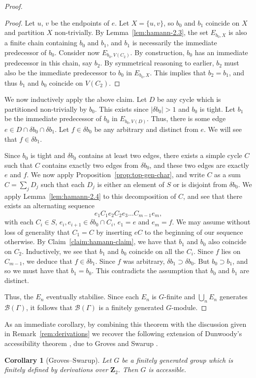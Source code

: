 \documentclass[11pt,a4paper]{amsart}
\newcommand{\Z}{\mathbf{Z}}
\newtheorem{corollary}[theorem]{Corollary}
\theoremstyle{definition}
\newcommand{\br}{{\mathscr{B}}}
\begin{document}
\begin{proof}
\begin{proof}
        Let $u$, $v$ be the endpoints of $e$.
        Let $X = \{u,v\}$, so $b_0$ and $b_1$ coincide on $X$ and partition $X$ non-trivially. By Lemma~\ref{lem:hamann-2.3}, the set $ E _{b_0,X}$ is also a finite chain containing $b_0$ and $b_1$, and $b_1$ is necessarily the immediate predecessor of $b_0$. 
        Consider now $ E _{b_0,V(C_2)}$. By construction, $b_0$ has an immediate predecessor in this chain, say $b_2$. By symmetrical reasoning to earlier, $b_2$ must also be the immediate predecessor to  $b_0$ in $ E _{b_0,X}$. This implies that $b_2 = b_1$, and thus $b_1$ and $b_0$ coincide on $V(C_2)$. 
    \end{proof}

    We now inductively apply the above claim. 
    Let $D$ be any cycle which is partitioned non-trivially by $b_0$. This exists since $|\delta b_0| > 1$ and $b_0$ is tight. Let $b_1$ be the immediate predecessor of $b_0$ in $ E _{b_0,V(D)}$. Thus, there is some edge $e \in D \cap \delta b_0 \cap \delta b_1$. Let $f \in \delta b_0$ be any arbitrary and distinct from $e$. We will see that $f \in \delta b_1$. 
    
    Since $b_0$ is tight and $\delta b_0$ contains at least two edges, there exists a simple cycle $C$ such that $C$ contains exactly two edges from $\delta b_0$, and these two edges are exactly $e$ and $f$. We now apply Proposition~\ref{prop:top-gen-char}, and write $C$ as a sum $C = \sum_j D_j$ such that each $D_j$ is either an element of $S$ or is disjoint from $\delta b_0$.  
    We apply Lemma~\ref{lem:hamann-2.4} to this decomposition of $C$, and see that there exists an alternating sequence 
    $$
    e_1 C_1 e_2C_2e_3 \ldots C_{m-1}e_m,
    $$
    with each $C_i \in  S $, $e_i, e_{i+1} \in \delta b_0 \cap C_i$, $e_1 = e$ and $e_m = f$. We may assume without loss of generality that $C_1 = C$ by inserting $eC$ to the beginning of our sequence otherwise.
    By Claim~\ref{claim:hamann-claim}, we have that $b_1$ and $b_0$ also coincide on $C_2$. Inductively, we see that $b_1$ and $b_0$ coincide on all the $C_i$. Since $f$ lies on $C_{m-1}$, we deduce that $f \in \delta b_1$. Since $f$ was arbitrary, $\delta b_1 \supset \delta b_0$. But $b_0 \supset b_1$, and so we must have that $b_1 = b_0$. This contradicts the assumption that $b_0$ and $b_1$ are distinct. 
    
    Thus, the $ E _n$ eventually stabilise. Since each $ E _n$ is $G$-finite and $\bigcup_n  E _n$ generates $\br(\Gamma)$, it follows that $\br(\Gamma)$ is a finitely generated $G$-module. 
\end{proof}


As an immediate corollary, by combining this theorem with the discussion given in Remark~\ref{rem:derivations} we recover the following extension of Dunwoody's accessibility theorem \cite{dunwoody1985accessibility}, due to Groves and Swarup \cite[Thm.~1.2]{groves1991remarks}.

\begin{corollary}[Groves--Swarup]
    Let $G$ be a finitely generated group which is finitely defined by derivations over $\Z_2 $. Then $G$ is accessible.
\end{corollary}
\end{document}
